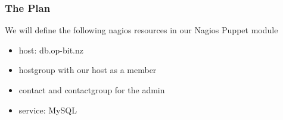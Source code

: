 \documentclass[10pt]{beamer}
\begin{document}
\begin{frame}
  \frametitle{The Plan}
  
  We will define the following nagios resources in our Nagios Puppet module
\begin{itemize}
\item host:  db.op-bit.nz
\item hostgroup with our host as a member
\item contact and contactgroup for the admin
\item service:  MySQL
\end{itemize}
\end{frame}



%
%
\end{document}
